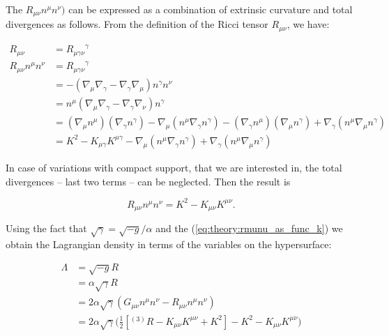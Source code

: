 {    The $R_{\mu\nu}n^{\mu}n^{\nu})$ can be expressed as a combination of extrinsic curvature and total divergences as follows.
    From the definition of the Ricci tensor $R_{\mu\nu}$, we have:
    
    \begin{align}
        R_{\mu\nu} &= {R_{\mu\gamma\nu}}^{\gamma} \\
        R_{\mu\nu}n^{\mu}n^{\nu} &= {R_{\mu\gamma\nu}}^{\gamma} \\
        &= -(\nabla_{\mu}\nabla_{\gamma} - \nabla_{\gamma}\nabla_{\mu})n^{\gamma}n^{\nu} \\
        &= n^{\mu}(\nabla_{\mu}\nabla_{\gamma} - \nabla_{\gamma}\nabla_{\nu})n^{\gamma} \\
        &= (\nabla_{\mu}n^{\mu})(\nabla_{\gamma}n^{\gamma}) - \nabla_{\mu}(n^{\mu}\nabla_{\gamma}n^{\gamma}) - (\nabla_{\gamma}n^{\mu})(\nabla_{\mu}n^{\gamma}) + \nabla_{\gamma}(n^{\mu}\nabla_{\mu}n^{\gamma}) \\
        &= K^2 - K_{\mu\gamma}K^{\mu\gamma} - \nabla_{\mu}(n^{\mu}\nabla_{\gamma}n^{\gamma}) + \nabla_{\gamma}(n^{\mu}\nabla_{\mu}n^{\gamma})
    \end{align}
    
    In case of variations with compact support, that we are interested in, the total divergences -- last two terms -- can be neglected. 
    Then the result is
    
    \begin{equation}
        R_{\mu\nu}n^{\mu}n^{\nu}= K^2 - K_{\mu\nu}K^{\mu\nu}.
    \label{eq:theory:rmunu_as_func_k}
    \end{equation}
    
    
    Using the fact that $\sqrt{\gamma}=\sqrt{-g}/\alpha$ and the (\ref{eq:theory:rmunu_as_func_k}) we obtain the Lagrangian density in terms of the variables on the hypersurface:
    
    \begin{align}
        \Lambda &= \sqrt{-g}R \\
        &= \alpha\sqrt{\gamma}R \\
        &= 2\alpha\sqrt{\gamma}(G_{\mu\nu}n^{\mu}n^{\nu} - R_{\mu\nu}n^{\mu}n^{\nu})\\ 
        &= 2\alpha\sqrt{\gamma}\Big(\frac{1}{2}[{^{(3)}R} - K_{\mu\nu}K^{\mu\nu} + K^2] - K^2 - K_{\mu\nu}K^{\mu\nu}\Big)
    \end{align}
    
}
